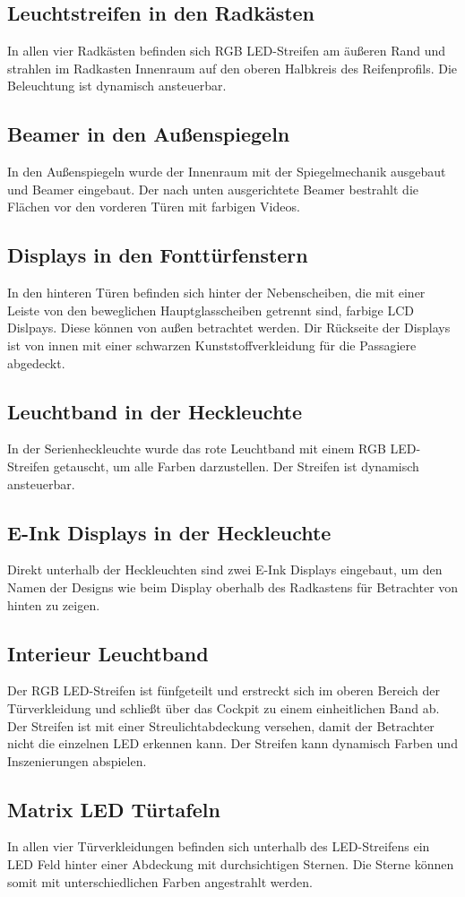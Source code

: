 \subsection{Leuchtstreifen in den Radkästen}
In allen vier Radkästen befinden sich RGB LED-Streifen am äußeren Rand und strahlen im Radkasten Innenraum auf den oberen Halbkreis des Reifenprofils. Die Beleuchtung ist dynamisch ansteuerbar.
\subsection{Beamer in den Außenspiegeln}
In den Außenspiegeln wurde der Innenraum mit der Spiegelmechanik ausgebaut und Beamer eingebaut. Der nach unten ausgerichtete Beamer bestrahlt die Flächen vor den vorderen Türen mit farbigen Videos.
\subsection{Displays in den Fonttürfenstern}
In den hinteren Türen befinden sich hinter der Nebenscheiben, die mit einer Leiste von den beweglichen Hauptglasscheiben getrennt sind, farbige LCD Dislpays. Diese können von außen betrachtet werden. Dir Rückseite der Displays ist von innen mit einer schwarzen Kunststoffverkleidung für die Passagiere abgedeckt.
\subsection{Leuchtband in der Heckleuchte}
In der Serienheckleuchte wurde das rote Leuchtband mit einem RGB LED-Streifen getauscht, um alle Farben darzustellen. Der Streifen ist dynamisch ansteuerbar.
\subsection{E-Ink Displays in der Heckleuchte}
Direkt unterhalb der Heckleuchten sind zwei E-Ink Displays eingebaut, um den Namen der Designs wie beim Display oberhalb des Radkastens für Betrachter von hinten zu zeigen.
\subsection{Interieur Leuchtband}
Der RGB LED-Streifen ist fünfgeteilt und erstreckt sich im oberen Bereich der Türverkleidung und schließt über das Cockpit zu einem einheitlichen Band ab. Der Streifen ist mit einer Streulichtabdeckung versehen, damit der Betrachter nicht die einzelnen LED erkennen kann. Der Streifen kann dynamisch Farben und Inszenierungen abspielen.
\subsection{Matrix LED Türtafeln}
In allen vier Türverkleidungen befinden sich unterhalb des LED-Streifens ein LED Feld hinter einer Abdeckung mit durchsichtigen Sternen. Die Sterne können somit mit unterschiedlichen Farben angestrahlt werden. 
